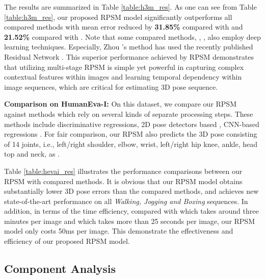 \documentclass[10pt,twocolumn,letterpaper]{article}
\begin{document}
The results are summarized in Table \ref{table:h3m_res}. As one can see from Table \ref{table:h3m_res}, our proposed RPSM model significantly outperforms all compared methods with mean error reduced by \textbf{31.85\%} compared with \cite{zhou2016deep} and \textbf{21.52\%} compared with \cite{DBLP:conf/eccv/SanzariNP16}. Note that some compared methods, \eg, \cite{li2015maximum,Tekin_2016_CVPR,DBLP:conf/eccv/DuWLHGWKG16,zhou2015sparseness,zhou2016deep}, also employ deep learning techniques. Especially, Zhou \etal \cite{zhou2016deep}'s method has used the recently published Residual Network \cite{he2015deep}. This superior performance achieved by RPSM demonstrates that utilizing multi-stage RPSM is simple yet powerful in capturing complex contextual features within images and learning temporal dependency within image sequences, which are critical for estimating 3D pose sequence.



\textbf{Comparison on HumanEva-I:} 
On this dataset, we compare our RPSM against methods which rely on several kinds of separate processing steps. These methods include discriminative regressions\cite{bo2010twin,BMVC2880}, 2D pose detectors based \cite{simo2012single,SimoSerraCVPR2013,wang2014robust,yasin2016dual}, CNN-based regressions \cite{Tekin_2016_CVPR}. 
For fair comparison, our RPSM also predicts the 3D pose consisting of 14 joints, i.e., left/right shoulder, elbow, wrist, left/right hip knee, ankle, head top and neck, as \cite{yasin2016dual}. 

Table \ref{table:hevai_res} illustrates the performance comparisons between our RPSM with compared methods. It is obvious that our RPSM model obtains substantially lower 3D pose errors than the compared methods, and achieves new state-of-the-art performance on all \emph{Walking, Jogging and Boxing} sequences. In addition, in terms of the time efficiency, compared with \cite{bo2010twin} which takes around three minutes per image and \cite{yasin2016dual} which takes more than 25 seconds per image, our RPSM model only costs 50ms per image. This demonstrate the effectiveness and efficiency of our proposed RPSM model. 




\subsection{Component Analysis}
\end{document}
